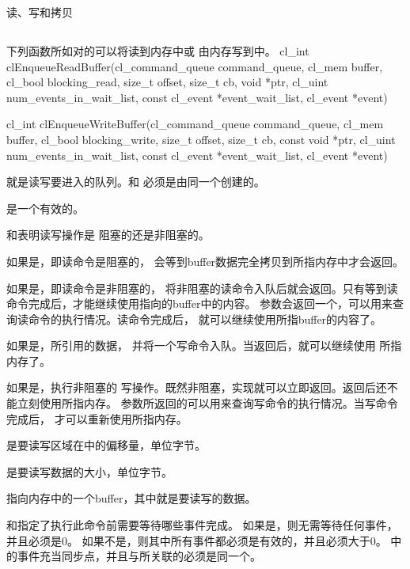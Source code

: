 \startbuffer[sectitlecreatbufobj]
读、写和拷贝
\stopbuffer
\subsection{\getbuffer[sectitlecreatbufobj]}

下列函数所如对的可以将读到内存中或
由内存写到中。
\startclc
cl_int clEnqueueReadBuffer(cl_command_queue command_queue,
			cl_mem buffer,
			cl_bool blocking_read,
			size_t offset,
			size_t cb,
			void *ptr,
			cl_uint num_events_in_wait_list,
			const cl_event *event_wait_list,
			cl_event *event)

cl_int clEnqueueWriteBuffer(cl_command_queue command_queue,
			cl_mem buffer,
			cl_bool blocking_write,
			size_t offset,
			size_t cb,
			const void *ptr,
			cl_uint num_events_in_wait_list,
			const cl_event *event_wait_list,
			cl_event *event)
\stopclc

就是读写要进入的队列。和
必须是由同一个\scopencl{}创建的。

是一个有效的。

和表明读写操作是
{\ftRef 阻塞}的还是{\ftRef 非阻塞}的。

如果是，即读命令是阻塞的，
会等到buffer数据完全拷贝到所指内存中才会返回。

如果是，即读命令是非阻塞的，
将非阻塞的读命令入队后就会返回。只有等到读命令完成后，才能继续使用指向的buffer中的内容。
参数会返回一个，可以用来查询读命令的执行情况。读命令完成后，
就可以继续使用所指buffer的内容了。

如果是，所引用的数据，
并将一个写命令入队。当返回后，就可以继续使用
所指内存了。

如果是，执行非阻塞的
写操作。既然非阻塞，实现就可以立即返回。返回后还不能立刻使用所指内存。
参数所返回的可以用来查询写命令的执行情况。当写命令完成后，
才可以重新使用所指内存。

是要读写区域在中的偏移量，单位字节。

是要读写数据的大小，单位字节。

指向内存中的一个buffer，其中就是要读写的数据。

和指定了执行此命令前需要等待哪些事件完成。
如果是，则无需等待任何事件，并且必须是0。
如果不是，则其中所有事件都必须是有效的，并且必须大于0。
中的事件充当同步点，并且与所关联的必须是同一个。


